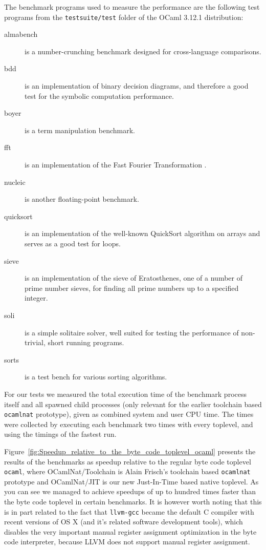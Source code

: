 \documentclass[10pt,a4paper,draft,twocolumn]{article}
\begin{document}
The benchmark programs used to measure the performance are the following test programs
from the \texttt{testsuite/test} folder of the OCaml 3.12.1 distribution:
\begin{description}
\item[almabench] is a number-crunching benchmark designed for cross-language comparisons.
\item[bdd] is an implementation of binary decision diagrams, and therefore a good test for
  the symbolic computation performance.
\item[boyer] is a term manipulation benchmark.
\item[fft] is an implementation of the Fast Fourier Transformation \cite{BrighamM67}.
\item[nucleic] is another floating-point benchmark.
\item[quicksort] is an implementation of the well-known QuickSort algorithm \cite{Hoare61b,Hoare62}
  on arrays and serves as a good test for loops.
\item[sieve] is an implementation of the sieve of Eratosthenes, one of a number of prime number sieves,
  for finding all prime numbers up to a specified integer.
\item[soli] is a simple solitaire solver, well suited for testing the performance of non-trivial,
  short running programs.
\item[sorts] is a test bench for various sorting algorithms.
\end{description}

For our tests we measured the total execution time of the benchmark process itself and all spawned
child processes (only relevant for the earlier toolchain based \texttt{ocamlnat} prototype), given
as combined system and user CPU time. The times were collected by executing each benchmark two times
with every toplevel, and using the timings of the fastest run.

Figure~\ref{fig:Speedup_relative_to_the_byte_code_toplevel_ocaml} presents the results of the benchmarks
as speedup relative to the regular byte code toplevel \texttt{ocaml}, where OCamlNat/Toolchain is
Alain Frisch's toolchain based \texttt{ocamlnat} prototype and OCamlNat/JIT is our new Just-In-Time based
native toplevel. As you can see we managed to achieve speedups of up to hundred times faster than the
byte code toplevel in certain benchmarks. It is however worth noting that this is in part related to
the fact that \texttt{llvm-gcc} became the default C compiler with recent versions of OS X (and it's
related software development tools), which disables the very important manual register assignment
optimization in the byte code interpreter, because LLVM does not support manual register assignment.
\end{document}
